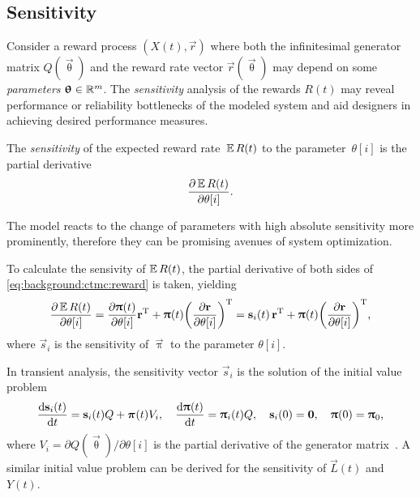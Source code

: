 \subsection{Sensitivity}

Consider a reward process $(X(t), \vec{r})$ where both the
infinitesimal generator matrix $Q(\vec{\uptheta})$ and the reward rate
vector $\vec{r}(\vec{\uptheta})$ may depend on some \emph{parameters}
$\bm{\mathrm{\uptheta}} \in \mathbb{R}^m$. The \emph{sensitivity} analysis of the
rewards $R(t)$ may reveal performance or reliability bottlenecks of
the modeled system and aid designers in achieving desired performance
measures.

\begin{dfn}
  The \emph{sensitivity} of the expected reward rate~$\operatorname{\mathbb{E}} R(t)$ to the
  parameter~$\theta[i]$ is the partial derivative
  \begin{equation}
    \frac{\partial \operatorname{\mathbb{E}} R(t)}{\partial \theta[i]} \text.
  \end{equation}
\end{dfn}

The model reacts to the change of parameters with high absolute
sensitivity more prominently, therefore they can be promising avenues
of system optimization.

To calculate the sensivity of $\operatorname{\mathbb{E}} R(t)$, the partial derivative of
both sides of \cref{eq:background:ctmc:reward} is taken, yielding
\begin{equation}
  \frac{\partial \Ex R(t)}{\partial \theta[i]} = \frac{\partial
    \vec{\uppi}(t)}{\partial \theta[i]} \vec{r}^\T + \vec{\uppi}(t)
  \mleft(\frac{\partial \vec{r}}{\partial \theta[i]}\mright)^\T =
  \vec{s}_i(t) \, \vec{r}^\T + \vec{\uppi}(t)
  \mleft(\frac{\partial \vec{r}}{\partial \theta[i]}\mright)^\T \text,
\end{equation}
where $\vec{s}_i$ is the sensitivity of $\vec{\uppi}$ to the parameter
$\theta[i]$.

In transient analysis, the sensitivity vector $\vec{s}_i$ is the
solution of the initial value problem
\begin{equation}
  \frac{\mathrm{d} \bm{\mathrm{s}}_i(t)}{\mathrm{d} t} = \bm{\mathrm{s}}_i(t) Q + \bm{\mathrm{\pi}}(t) V_i,
  \quad \frac{\mathrm{d} \bm{\mathrm{\uppi}}(t)}{\mathrm{d} t} = \bm{\mathrm{\uppi}}_i(t) Q,
  \quad \bm{\mathrm{s}}_i(0) = \bm{\mathrm{0}}, \quad \bm{\mathrm{\uppi}}(0) = \bm{\mathrm{\uppi}}_0
  \text,
\end{equation}
where $V_i = \partial Q(\vec{\uptheta}) / \partial \theta[i]$ is the
partial derivative of the generator
matrix~\citep{DBLP:conf/sigmetrics/RameshT93}. A similar initial value
problem can be derived for the sensitivity of $\vec{L}(t)$ and $Y(t)$.

